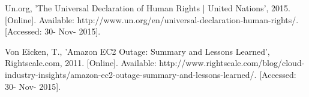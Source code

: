 \documentclass{scu-thesis}
\begin{document}
\begin{thebibliography}{9}
Un.org, 'The Universal Declaration of Human Rights | United Nations', 2015. [Online]. Available: http://www.un.org/en/universal-declaration-human-rights/. [Accessed: 30- Nov- 2015].

Von Eicken, T., 'Amazon EC2 Outage: Summary and Lessons Learned', Rightscale.com, 2011. [Online]. Available: http://www.rightscale.com/blog/cloud-industry-insights/amazon-ec2-outage-summary-and-lessons-learned/. [Accessed: 30- Nov- 2015].


\end{thebibliography}

\backmatter
\end{document}

